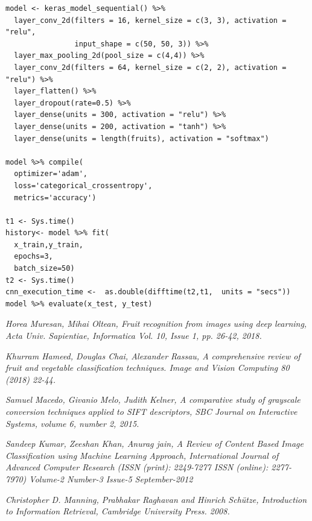 \documentclass{article}
\begin{document}
\begin{verbatim}
model <- keras_model_sequential() %>%
  layer_conv_2d(filters = 16, kernel_size = c(3, 3), activation = "relu",
                input_shape = c(50, 50, 3)) %>%
  layer_max_pooling_2d(pool_size = c(4,4)) %>%
  layer_conv_2d(filters = 64, kernel_size = c(2, 2), activation = "relu") %>%
  layer_flatten() %>%
  layer_dropout(rate=0.5) %>%
  layer_dense(units = 300, activation = "relu") %>%
  layer_dense(units = 200, activation = "tanh") %>%
  layer_dense(units = length(fruits), activation = "softmax")

model %>% compile(
  optimizer='adam',
  loss='categorical_crossentropy',
  metrics='accuracy')

t1 <- Sys.time()
history<- model %>% fit(
  x_train,y_train,
  epochs=3,
  batch_size=50)
t2 <- Sys.time()
cnn_execution_time <-  as.double(difftime(t2,t1,  units = "secs"))
model %>% evaluate(x_test, y_test)

\end{verbatim}

\newpage
\begin{thebibliography}{9}

\textit{Horea Muresan, Mihai Oltean, Fruit recognition from images using deep learning, Acta Univ. Sapientiae, Informatica Vol. 10, Issue 1, pp. 26-42, 2018.}

\textit{Khurram Hameed, Douglas Chai, Alexander Rassau, A comprehensive review of fruit and vegetable classification techniques. Image and Vision Computing 80 (2018) 22-44.} 

\textit{Samuel Macedo, Givanio Melo, Judith Kelner, A comparative study of grayscale conversion techniques applied to SIFT descriptors, SBC Journal on Interactive Systems, volume 6, number 2, 2015.}

\textit{Sandeep Kumar, Zeeshan Khan, Anurag jain, A Review of Content Based Image Classification using Machine Learning Approach, International Journal of Advanced Computer Research (ISSN (print): 2249-7277 ISSN (online): 2277-7970) Volume-2 Number-3 Issue-5 September-2012}

\textit{Christopher D. Manning, Prabhakar Raghavan and Hinrich Schütze, Introduction to Information Retrieval, Cambridge University Press. 2008.}

\end{thebibliography} 
\end{document}
